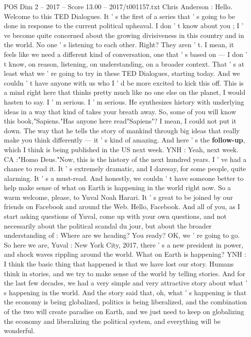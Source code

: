 \begin{textsample}{POS Dim 2 – 2017 – Score 13.00 – 2017/t001157.txt}  \label{ex:f2_pos_047}
Chris Anderson : Hello.
Welcome to this TED Dialogues.
It ' s the first of a series that ' s going to be done in response to the current political upheaval.
I don ' t know about you ; I ' ve become quite concerned about the growing divisiveness in this country and in the world.
No one ' s listening to each other.
Right?
They aren ' t.
I mean, it feels like we need a different kind of conversation, one that ' s based on — I don ' t know, on reason, listening, on understanding, on a broader context.
That ' s at least what we ' re going to try in these TED Dialogues, starting today.
And we couldn ' t have anyone with us who I ' d be more excited to kick this off.
This is a mind right here that thinks pretty much like no one else on the planet, I would hasten to say.
I ' m serious.
I ' m serious.
He synthesizes history with underlying ideas in a way that kind of takes your breath away.
So, some of you will know this book,"Sapiens."Has anyone here read"Sapiens"?
I mean, I could not put it down.
The way that he tells the story of mankind through big ideas that really make you think differently — it ' s kind of amazing.
And here ' s the \textbf{follow-up}, which I think is being published in the US next week.
YNH : Yeah, next week.
CA :"Homo Deus."Now, this is the history of the next hundred years.
I ' ve had a chance to read it.
It ' s extremely dramatic, and I daresay, for some people, quite alarming.
It ' s a must-read.
And honestly, we couldn ' t have someone better to help make sense of what on Earth is happening in the world right now.
So a warm welcome, please, to Yuval Noah Harari.
It ' s great to be joined by our friends on Facebook and around the Web.
Hello, Facebook.
And all of you, as I start asking questions of Yuval, come up with your own questions, and not necessarily about the political scandal du jour, but about the broader understanding of : Where are we heading?
You ready?
OK, we ' re going to go.
So here we are, Yuval : New York City, 2017, there ' s a new president in power, and shock waves rippling around the world.
What on Earth is happening?
YNH : I think the basic thing that happened is that we have lost our story.
Humans think in stories, and we try to make sense of the world by telling stories.
And for the last few decades, we had a very simple and very attractive story about what ' s happening in the world.
And the story said that, oh, what ' s happening is that the economy is being globalized, politics is being liberalized, and the combination of the two will create paradise on Earth, and we just need to keep on globalizing the economy and liberalizing the political system, and everything will be wonderful.

\end{textsample}
